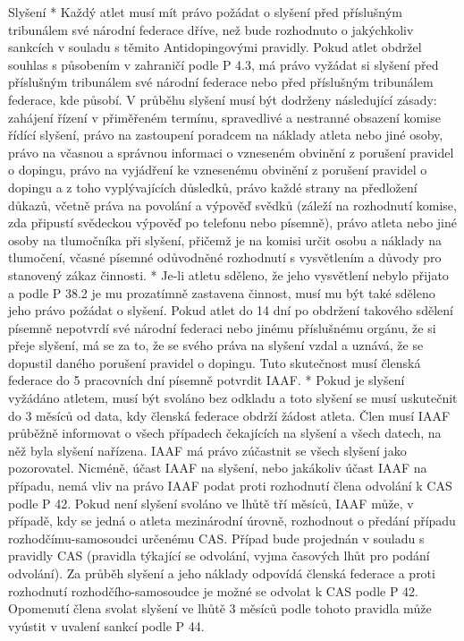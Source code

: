 Slyšení
* Každý atlet musí mít právo požádat o slyšení před příslušným tribunálem své národní federace dříve, než bude rozhodnuto o jakýchkoliv sankcích v souladu s těmito Antidopingovými pravidly. Pokud atlet obdržel souhlas s působením v zahraničí podle P 4.3, má právo vyžádat si slyšení před příslušným tribunálem své národní federace nebo před příslušným tribunálem federace, kde působí. V průběhu slyšení musí být dodrženy následující zásady: zahájení řízení v přiměřeném termínu, spravedlivé a nestranné obsazení komise řídící slyšení, právo na zastoupení poradcem na náklady atleta nebo jiné osoby, právo na včasnou a správnou informaci o vzneseném obvinění z porušení pravidel o dopingu, právo na vyjádření ke vznesenému obvinění z porušení pravidel o dopingu a z toho vyplývajících důsledků, právo každé strany na předložení důkazů, včetně práva na povolání a výpověď svědků (záleží na rozhodnutí komise, zda připustí svědeckou výpověď po telefonu nebo písemně), právo atleta nebo jiné osoby na tlumočníka při slyšení, přičemž je na komisi určit osobu a náklady na tlumočení, včasné písemné odůvodněné rozhodnutí s vysvětlením a důvody pro stanovený zákaz činnosti.
* Je-li atletu sděleno, že jeho vysvětlení nebylo přijato a podle P 38.2 je mu prozatímně zastavena činnost, musí mu být také sděleno jeho právo požádat o slyšení. Pokud atlet do 14 dní po obdržení takového sdělení písemně nepotvrdí své národní federaci nebo jinému příslušnému orgánu, že si přeje slyšení, má se za to, že se svého práva na slyšení vzdal a uznává, že se dopustil daného porušení pravidel o dopingu. Tuto skutečnost musí členská federace do 5 pracovních dní písemně potvrdit IAAF.
* Pokud je slyšení vyžádáno atletem, musí být svoláno bez odkladu a toto slyšení se musí uskutečnit do 3 měsíců od data, kdy členská federace obdrží žádost atleta. Člen musí IAAF průběžně informovat o všech případech čekajících na slyšení a všech datech, na něž byla slyšení nařízena. IAAF má právo zúčastnit se všech slyšení jako pozorovatel. Nicméně, účast IAAF na slyšení, nebo jakákoliv účast IAAF na případu, nemá vliv na právo IAAF podat proti rozhodnutí člena odvolání k CAS podle P 42. Pokud není slyšení svoláno ve lhůtě tří měsíců, IAAF může, v případě, kdy se jedná o atleta mezinárodní úrovně, rozhodnout o předání případu rozhodčímu-samosoudci určenému CAS. Případ bude projednán v souladu s pravidly CAS (pravidla týkající se odvolání, vyjma časových lhůt pro podání odvolání). Za průběh slyšení a jeho náklady odpovídá členská federace a proti rozhodnutí rozhodčího-samosoudce je možné se odvolat k CAS podle P 42. Opomenutí člena svolat slyšení ve lhůtě 3 měsíců podle tohoto pravidla může vyústit v uvalení sankcí podle P 44.
